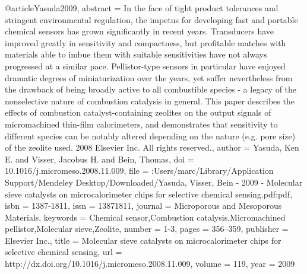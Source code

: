 @article{Yasuda2009,
abstract = {In the face of tight product tolerances and stringent environmental regulation, the impetus for developing fast and portable chemical sensors has grown significantly in recent years. Transducers have improved greatly in sensitivity and compactness, but profitable matches with materials able to imbue them with suitable sensitivities have not always progressed at a similar pace. Pellistor-type sensors in particular have enjoyed dramatic degrees of miniaturization over the years, yet suffer nevertheless from the drawback of being broadly active to all combustible species - a legacy of the nonselective nature of combustion catalysis in general. This paper describes the effects of combustion catalyst-containing zeolites on the output signals of micromachined thin-film calorimeters, and demonstrates that sensitivity to different species can be notably altered depending on the nature (e.g. pore size) of the zeolite used. {\textcopyright} 2008 Elsevier Inc. All rights reserved.},
author = {Yasuda, Ken E. and Visser, Jacobus H. and Bein, Thomas},
doi = {10.1016/j.micromeso.2008.11.009},
file = {:Users/marc/Library/Application Support/Mendeley Desktop/Downloaded/Yasuda, Visser, Bein - 2009 - Molecular sieve catalysts on microcalorimeter chips for selective chemical sensing.pdf:pdf},
isbn = {1387-1811},
issn = {13871811},
journal = {Microporous and Mesoporous Materials},
keywords = {Chemical sensor,Combustion catalysis,Micromachined pellistor,Molecular sieve,Zeolite},
number = {1-3},
pages = {356--359},
publisher = {Elsevier Inc.},
title = {{Molecular sieve catalysts on microcalorimeter chips for selective chemical sensing}},
url = {http://dx.doi.org/10.1016/j.micromeso.2008.11.009},
volume = {119},
year = {2009}
}
